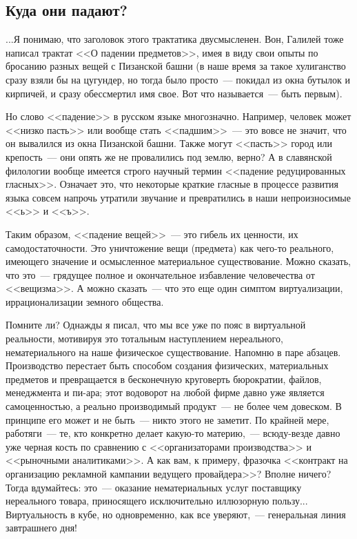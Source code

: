 \documentclass{scrbook}
\newcommand{\flqq}{<<}
\newcommand{\frqq}{>>}
\newcommand{\mdash}{~--- }
\newcommand{\commamdash}{~--- } %
\newcommand{\essaysection}[1]{\subsection*{#1}\nopagebreak}
\begin{document}
\essaysection{Куда они падают?}

...Я понимаю, что заголовок этого трактатика двусмысленен. Вон, Галилей тоже написал трактат {\flqq}О падении предметов{\frqq}, имея в виду свои опыты по бросанию разных вещей с Пизанской башни (в наше время за такое хулиганство сразу взяли бы на цугундер, но тогда было просто{\mdash}покидал из окна бутылок и кирпичей, и сразу обессмертил имя свое. Вот что называется{\mdash}быть первым).

Но слово {\flqq}падение{\frqq} в русском языке многозначно. Например, человек может {\flqq}низко пасть{\frqq} или вообще стать {\flqq}падшим{\frqq}{\mdash}это вовсе не значит, что он вывалился из окна Пизанской башни. Также могут {\flqq}пасть{\frqq} город или крепость{\mdash}они опять же не провалились под землю, верно? А в славянской филологии вообще имеется строго научный термин {\flqq}падение редуцированных гласных{\frqq}. Означает это, что некоторые краткие гласные в процессе развития языка совсем напрочь утратили звучание и превратились в наши непроизносимые {\flqq}ь{\frqq} и {\flqq}ъ{\frqq}.

Таким образом, {\flqq}падение вещей{\frqq}{\mdash}это гибель их ценности, их самодостаточности. Это уничтожение вещи (предмета) как чего-то реального, имеющего значение и осмысленное материальное существование. Можно сказать, что это{\mdash}грядущее полное и окончательное избавление человечества от {\flqq}вещизма{\frqq}. А можно сказать{\mdash}что это еще один симптом виртуализации, иррационализации земного общества.

Помните ли? Однажды я писал, что мы все уже по пояс в виртуальной реальности, мотивируя это тотальным наступлением нереального, нематериального на наше физическое существование. Напомню в паре абзацев. Производство перестает быть способом создания физических, материальных предметов и превращается в бесконечную круговерть бюрократии, файлов, менеджмента и пи-ара; этот водоворот на любой фирме давно уже является самоценностью, а реально производимый продукт{\mdash}не более чем довеском. В принципе его может и не быть{\mdash}никто этого не заметит. По крайней мере, работяги{\mdash}те, кто конкретно делает какую-то материю,{\commamdash}всюду-везде давно уже черная кость по сравнению с {\flqq}организаторами производства{\frqq} и {\flqq}рыночными аналитиками{\frqq}. А как вам, к примеру, фразочка {\flqq}контракт на организацию рекламной кампании ведущего провайдера{\frqq}? Вполне ничего? Тогда вдумайтесь: это{\mdash}оказание нематериальных услуг поставщику нереального товара, приносящего исключительно иллюзорную пользу... Виртуальность в кубе, но одновременно, как все уверяют,{\commamdash}генеральная линия завтрашнего дня!
\end{document}
